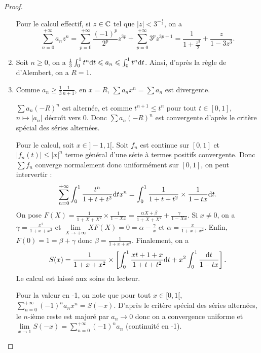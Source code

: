 \documentclass[12pt]{article}
\begin{document}
\begin{proof}
\begin{enumerate}
        Pour le calcul effectif, si $z\in\mathbb{C}$ tel que $\left\lvert z\right\rvert<3^{-\frac{1}{3}}$, on a 
        \begin{equation}
            \sum_{n=0}^{+\infty}a_{n}z^{n}=\sum_{p=0}^{+\infty}\frac{(-1)^{p}}{2^{p}}z^{3p}+\sum_{p=0}^{+\infty}3^{p}z^{3p+1}=\frac{1}{1+\frac{z^{3}}{2}}+\frac{z}{1-3z^{3}}.
        \end{equation}

        \item Soit $n\geqslant0$, on a $\frac{1}{3}\int_{0}^{1}t^{n}\mathrm{d} t\leqslant a_n\leqslant\int_{0}^{1}t^{n}\mathrm{d} t$. Ainsi, d'après la règle de d'Alembert, on a $R=1$.
        \item 
        Comme $a_n\geqslant\frac{1}{3}\frac{1}{n+1}$, en $x=R$, $\sum a_nx^{n}=\sum a_n$ est divergente. 
        
        $\sum a_n(-R)^{n}$ est alternée, et comme $t^{n+1}\leqslant t^{n}$ pour tout $t\in[0,1]$, $n\mapsto\left\lvert a_n\right\rvert$ décroît vers 0. Donc $\sum a_n(-R)^{n}$ est convergente d'après le critère spécial des séries alternées. 

        Pour le calcul, soit $x\in]-1,1[$. Soit 
        $f_n$ est continue sur $[0,1]$ et $\left\lvert f_n(t)\right\rvert\leqslant\left\lvert x\right\rvert^{n}$ terme général d'une série à termes positifs convergente. Donc $\sum f_n$ converge normalement donc uniformément sur $[0,1]$, on peut intervertir :
        \begin{equation}
            \sum_{n=0}^{+\infty}\int_{0}^{1}\frac{t^{n}}{1+t+t^{2}}\mathrm{d} t x^{n}=\int_{0}^{1}\frac{1}{1+t+t^{2}}\times \frac{1}{1-tx}\mathrm{d} t.
        \end{equation}
        On pose $F(X)=\frac{1}{1+X+X^{2}}\times\frac{1}{1-Xx}=\frac{\alpha X+\beta}{1+X+X^{2}}+\frac{\gamma}{1-Xx}$. Si $x\neq0$, on a $\gamma=\frac{x^{2}}{1+x+x^{2}}$ et $\lim\limits_{X\to+\infty}XF(X)=0=\alpha-\frac{\gamma}{x}$ et $\alpha=\frac{x}{1+x+x^{2}}$. Enfin, $F(0)=1=\beta+\gamma$ donc $\beta=\frac{1}{1+x+x^{2}}$. Finalement, on a 
        \begin{equation}
            S(x)=\frac{1}{1+x+x^{2}}\times\left[\int_{0}^{1}\frac{xt+1+x}{1+t+t^{2}}\mathrm{d} t+x^{2}\int_{0}^{1}\frac{\mathrm{d} t}{1-tx}\right].
        \end{equation}
        Le calcul est laissé aux soins du lecteur.

        Pour la valeur en -1, on note que pour tout $x\in[0,1[$, $\sum_{n=0}^{+\infty}(-1)^{n}a_nx^{n}=S(-x)$. D'après le critère spécial des séries alternées, le $n$-ième reste est majoré par $a_n\to0$ donc on a convergence uniforme et $\lim\limits_{x\to1}S(-x)=\sum_{n=0}^{+\infty}(-1)^{n}a_n$ (continuité en -1).
    \end{enumerate}
\end{proof}
\end{document}
